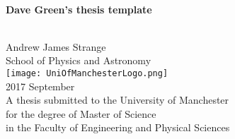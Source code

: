 \ifpdf
\fi
%
%
\begin{center}
 \qquad\\[10mm]
 {\renewcommand\baselinestretch{1.2}\Huge\textbf{
%
%
   Dave Green's thesis template
%
 }\par}
 \qquad\\[50mm]
 {\LARGE Andrew James Strange}\\[10mm]
 {\large School of Physics and Astronomy}\\[10mm]
 \texttt{[image: UniOfManchesterLogo.png]}\\[30mm]
 {\Large 2017 September}\\[10mm]
 {\large A thesis submitted to the University of Manchester \\ for the degree of Master of Science \\ in the Faculty of Engineering and Physical Sciences}
\end{center}

\cleardoublepage

\endinput
